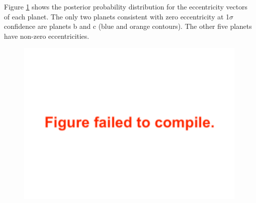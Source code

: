 \documentclass[twocolumn]{aastex63}
\begin{document}
Figure \ref{fig:eccentricity_vectors} shows the posterior probability distribution
for the eccentricity vectors of each planet.  The only two planets consistent with
zero eccentricity at 1$\sigma$ confidence are planets b and
c (blue and orange contours).  The other five planets have non-zero eccentricities.

\begin{figure}
    \centering
    \includegraphics[width=\hsize]{figures/esin_vs_ecos.pdf}
    \label{fig:eccentricity_vectors}
\end{figure}
\end{document}
